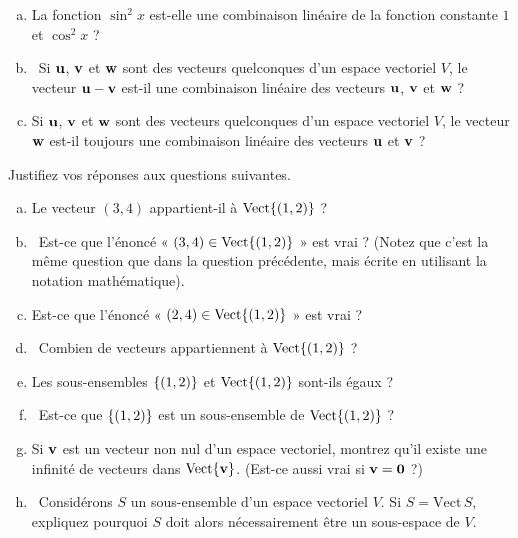 \begin{prob}
\begin{enumerate}[a)]
\item La fonction $\sin^2 x$ est-elle une combinaison linéaire de la fonction constante $1$ et $\cos^2 x$ ?
\medskip

\item\sov~Si $\uu$, $\vv$ et $\ww$ sont des vecteurs quelconques d'un espace vectoriel $V$, le vecteur $\uu-\vv$ est-il une combinaison linéaire des vecteurs $\uu$, $\vv$ et $\ww$ ?
\medskip

\item Si $\uu$, $\vv$ et $\ww$ sont des vecteurs quelconques d'un espace vectoriel $V$, le vecteur $\ww$ est-il toujours une combinaison linéaire des vecteurs $\uu$ et $\vv$ ?
\medskip


\end{enumerate}

\end{prob} \begin{prob} \label{prob06.2}  Justifiez vos réponses aux questions suivantes.
\medskip
\begin{enumerate}[a)]
\item Le vecteur $(3,4)$ appartient-il à $\sp{(1,2)}$ ? \medskip

\item\sov~Est-ce que l'énoncé «  $(3,4) \in\sp{(1,2)} $  » est vrai ? (Notez que c'est la même question que dans la question précédente, mais écrite en utilisant la notation mathématique).
\medskip


\item Est-ce que l'énoncé «  $(2,4) \in \sp{(1,2)}$  » est vrai ?
\medskip


\item\sov~Combien de vecteurs appartiennent à $\sp{(1,2)}$ ?
\medskip

\item Les sous-ensembles $\set{(1,2)}$ et $\sp{(1,2)}$ sont-ils égaux ?
\medskip

\item\sov~Est-ce que $\set{(1,2)}$ est un sous-ensemble de $\sp{(1,2)}$ ?
\medskip

\item
\medskip Si $\vv$ est un vecteur non nul d'un espace vectoriel, montrez qu'il existe une infinité de vecteurs dans $\sp{\vv}$. (Est-ce aussi vrai si $\vv=\zero$ ?)\medskip

\item\sov~Considérons $S$ un sous-ensemble d'un espace vectoriel $V$.  Si $S= \text{Vect}\, S$, expliquez pourquoi $S$ doit alors nécessairement être un sous-espace de $V$.
\medskip



\end{enumerate}
\end{prob}
